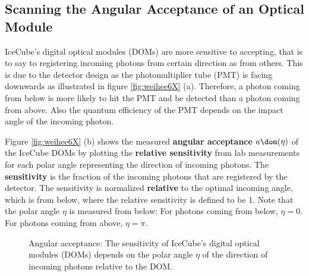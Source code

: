 
\subsection{Scanning the Angular Acceptance of an Optical Module}
\label{sec:angular_acceptance_scan}

IceCube's digital optical modules (DOMs) are more sensitive to accepting, that is to say to registering incoming photons from certain direction as from others. This is due to the detector design as the photomultiplier tube (PMT) is facing downwards as illustrated in figure \ref{fig:weihee6X} (a). Therefore, a photon coming from below is more likely to hit the PMT and be detected than a photon coming from above. Also the quantum efficiency of the PMT depends on the impact angle of the incoming photon.


Figure \ref{fig:weihee6X} (b) shows the measured \textbf{angular acceptance} $a\dom(\eta)$ of the IceCube DOMs by plotting the \textbf{relative sensitivity} from lab measurements for each polar angle representing the direction of incoming photons. \cite{icepaper} The \textbf{sensitivity} is the fraction of the incoming photons that are registered by the detector. The sensitivity is normalized \textbf{relative} to the optimal incoming angle, which is from below, where the relative sensitivity is defined to be 1. Note that the polar angle $\eta$ is measured from below: For photons coming from below, $\eta = 0$. For photons coming from above, $\eta = \pi$.


\begin{figure}[htbp]
  \hfill
  \caption{Angular acceptance: The sensitivity of IceCube's digital optical modules (DOMs) depends on the polar angle $\eta$ of the direction of incoming photons relative to the DOM.}
  \label{fig:weihee6X}\label{fig:icepaper}
\end{figure}

